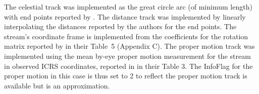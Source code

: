 The celestial track was implemented as the great circle arc (of minimum length) with end points reported by \citet{Shipp2018}. The distance track was implemented by linearly interpolating the distances reported by the authors for the end points.  The stream's coordinate  frame is implemented from the coefficients for the rotation matrix reported by \citet{Shipp2019} in their Table~5 (Appendix C). The proper motion track was implemented using the mean by-eye proper motion measurement for the stream in observed ICRS coordinates, reported in \citet{Shipp2019} in their Table 3.  
The InfoFlag for the proper motion in this case is thus set to 2 to reflect the proper motion track is available but is an approximation.
